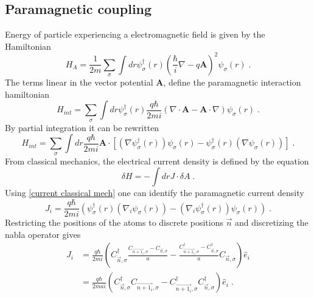 \documentclass{article}
\begin{document}
\subsection{Paramagnetic coupling}
Energy of particle experiencing a electromagnetic field is given by the Hamiltonian
\begin{equation}
    H_A = \frac{1}{2m} \sum_{\sigma} \int dr \psi_{\sigma}^{\dagger}(r) \left( \frac{\hbar}{i} \nabla - q \textbf{A} \right)^2 \psi_{\sigma}(r)\;.
\end{equation}
The terms linear in the vector potential $\textbf{A}$, define the paramagnetic interaction hamiltonian 
\begin{equation}
    H_{int} = \sum_{\sigma} \int dr  \psi_{\sigma}^{\dagger}(r) \frac{q\hbar}{2mi}\left(  \nabla \cdot \textbf{A}  -  \textbf{A} \cdot \nabla \right) \psi_{\sigma}(r) \;.
\end{equation}
By partial integration it can be rewritten
\begin{equation}
    H_{int} = \sum_{\sigma} \int dr \frac{q\hbar}{2mi} \textbf{A} \cdot \left[  (\nabla  \psi_{\sigma}^{\dagger}(r)) \psi_{\sigma}(r)   -   \psi_{\sigma}^{\dagger}(r) (\nabla \psi_{\sigma}(r))  \right] \;.
\end{equation}
From classical mechanics, the electrical current density is defined by the equation
\begin{equation}
    \delta H = - \int dr J \cdot \delta A \;.
    \label{current classical mech}
\end{equation}
Using \cref{current classical mech} one can identify the paramagnetic current density
\begin{equation}
    J_i = \frac{q \hbar}{2mi} (\psi_{\sigma}^{\dagger}(r) (\nabla_i \psi_{\sigma}(r)) - (\nabla_i  \psi_{\sigma}^{\dagger}(r)) \psi_{\sigma}(r))\;.
\end{equation}
Restricting the positions of the atoms to discrete positions $\vec{n}$ and discretizing the nabla operator gives
\begin{align}
    J_i &= \frac{q \hbar}{2mi} (C_{\vec{n},\sigma}^{\dagger} \frac{C_{\vec{n + 1_i},\sigma} - C_{\vec{n},\sigma}}{a}  - \frac{C_{\vec{n + 1_i},\sigma}^{\dagger} - C_{\vec{n},\sigma}^{\dagger}}{a} C_{\vec{n},\sigma}) \hat{e}_i\nonumber\\
      &= \frac{q \hbar}{2mai} (C_{\vec{n},\sigma}^{\dagger} C_{\vec{n + 1_i},\sigma} - C_{\vec{n + 1_i},\sigma}^{\dagger} C_{\vec{n},\sigma}^{\dagger})\hat{e}_i\;.\label{current component} 
\end{align}
\end{document}
